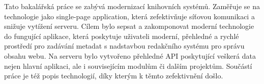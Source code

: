 \documentclass[12pt]{report}
\begin{document}
Tato bakalářská práce se zabývá modernizací knihovních systémů.
Zaměřuje se na technologie jako single-page application, která zefektivňuje
síťovou komunikaci a snižuje vytížení serveru.
Cílem bylo sepsat a zakomponovat moderní technologie do fungující aplikace,
která poskytuje uživateli moderní, přehledné a rychlé prostředí pro zadávání 
metadat s nadstavbou redakčního systému pro správu obsahu webu.
Na serveru bylo vytvořeno přehledné API poskytující veškerá data nejen
hlavní aplikaci, ale i souvisejícím modulům či dalším projektům.
Součástí práce je též popis technologií, díky kterým k těmto
zefektivnění došlo.
\end{document}
